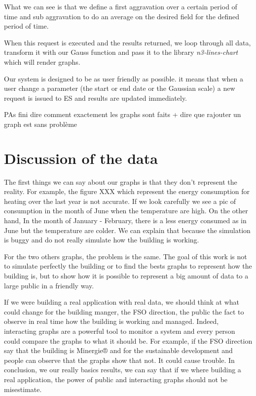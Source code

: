 \documentclass{acm_proc_article-sp}
\begin{document}


What we can see is that we define a first aggravation over a certain period of time and sub aggravation to do an average on the desired field for the defined period of time.

When this request is executed and the results returned, we loop through all data, transform it with our Gauss function and pass it to the library \emph{n3-lines-chart} which will render graphs.

Our system is designed to be as user friendly as possible. it means that when a user change a parameter (the start or end date or the Gaussian scale) a new request is issued to ES and results are updated immediately. 

PAs fini dire comment exactement les graphs sont faits + dire que rajouter un graph est sans problème

\section{Discussion of the data}
\label{discuss}
The first things we can say about our graphs is that they don’t represent the reality. For example, the figure XXX which represent the energy consumption for heating over the last year is not accurate. If we look carefully we see a pic of consumption in the month of June when the temperature are high. On the other hand, In the month of January - February, there is a less energy consumed as in June but the temperature are colder. We can explain that because the simulation is buggy and do not really simulate how the building is working.

For the two others graphs, the problem is the same. The goal of this work is not to simulate perfectly the building or to find the bests graphs to represent how the building is, but to show how it is possible to represent a big amount of data to a large public in a friendly way.

If we were building a real application with real data, we should think at what could change for the building manger, the FSO direction, the public the fact to observe in real time how the building is working and managed. Indeed, interacting graphs are a powerful tool to monitor a system and every person could compare the graphs to what it should be. For example, if the FSO direction say that the building is Minergie® and for the sustainable development and people can observe that the graphs show that not. It could cause trouble. In conclusion, we our really basics results, we can say that if we where building a real application, the power of public and interacting graphs should not be misestimate.
\end{document}
